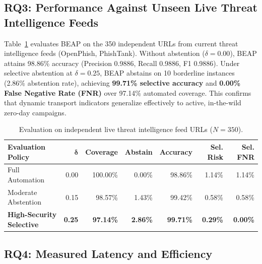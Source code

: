 \documentclass{llncs}
\begin{document}
\subsection{RQ3: Performance Against Unseen Live Threat Intelligence Feeds}

Table~\ref{tab:feeds} evaluates BEAP on the 350 independent URLs from current threat intelligence feeds (OpenPhish, PhishTank). Without abstention ($\delta=0.00$), BEAP attains 98.86\% accuracy (Precision 0.9886, Recall 0.9886, F1 0.9886). Under selective abstention at $\delta=0.25$, BEAP abstains on 10 borderline instances (2.86\% abstention rate), achieving \textbf{99.71\% selective accuracy} and \textbf{0.00\% False Negative Rate (FNR)} over 97.14\% automated coverage. This confirms that dynamic transport indicators generalize effectively to active, in-the-wild zero-day campaigns.

\begin{table}[t]
\caption{Evaluation on independent live threat intelligence feed URLs ($N=350$).}
\label{tab:feeds}
\centering
\setlength{\tabcolsep}{5pt}
\renewcommand{\arraystretch}{0.92}
\begin{tabular}{lrrrrrr}
\toprule
\textbf{Evaluation Policy} & $\mathbf{\delta}$ & \textbf{Coverage} & \textbf{Abstain} & \textbf{Accuracy} & \textbf{Sel. Risk} & \textbf{Sel. FNR} \\
\midrule
Full Automation & 0.00 & 100.00\% & 0.00\% & 98.86\% & 1.14\% & 1.14\% \\
Moderate Abstention & 0.15 & 98.57\% & 1.43\% & 99.42\% & 0.58\% & 0.58\% \\
\textbf{High-Security Selective} & \textbf{0.25} & \textbf{97.14\%} & \textbf{2.86\%} & \textbf{99.71\%} & \textbf{0.29\%} & \textbf{0.00\%} \\
\bottomrule
\end{tabular}
\end{table}

\subsection{RQ4: Measured Latency and Efficiency}
\end{document}
